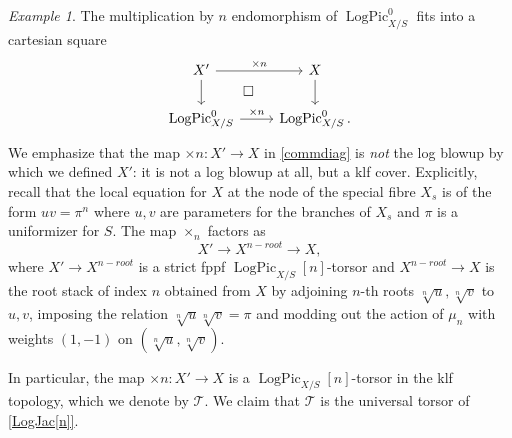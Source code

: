 \documentclass[a4paper,11pt]{amsart} %
\numberwithin{equation}{subsection}
\newcommand{\on}[1]{\operatorname{#1}}
\newcommand{\ca}[1]{{\mathcal{#1}}}
\theoremstyle{definition}
\theoremstyle{plain}%
\theoremstyle{remark}
\newtheorem{example}[definition]{Example}
\begin{document}
\begin{example}
The multiplication by $n$ endomorphism of $\on{LogPic}^0_{X/S}$ fits into a cartesian square
\begin{equation}\label{commdiag}
\begin{tikzcd}
    X' \arrow[r,"\times n"] \ar[dr, phantom, "\square"]\arrow[d] & X \arrow[d] \\
    \on{LogPic}^0_{X/S} \arrow[r,"\times n"] & \on{LogPic}^0_{X/S}.
\end{tikzcd}
\end{equation}
We emphasize that the map $\times n \colon X' \to X$ in \ref{commdiag} is \emph{not} the log blowup by which we defined $X'$: it is not a log blowup at all, but a klf cover. Explicitly, recall that the local equation for $X$ at the node of the special fibre $X_s$ is of the form $uv=\pi^n$ where $u,v$ are parameters for the branches of $X_s$ and $\pi$ is a uniformizer for $S$. The map $\times_n$ factors as
\[
X' \to X^{n-root} \to X,
\]
where $X' \to X^{n-root}$ is a strict fppf $\on{LogPic}_{X/S}[n]$-torsor and $X^{n-root} \to X$ is the root stack of index $n$ obtained from $X$ by adjoining $n$-th roots $\sqrt[n]{u},\sqrt[n]{v}$ to $u,v$, imposing the relation $\sqrt[n]{u}\sqrt[n]{v}=\pi$ and modding out the action of $\mu_n$ with weights $(1,-1)$ on $(\sqrt[n]{u},\sqrt[n]{v})$.

In particular, the map $\times n \colon X' \to X$ is a $\on{LogPic}_{X/S}[n]$-torsor in the klf topology, which we denote by $\ca T$. We claim that $\ca T$ is the universal torsor of \ref{LogJac[n]}. \\


\end{example}
\end{document}
